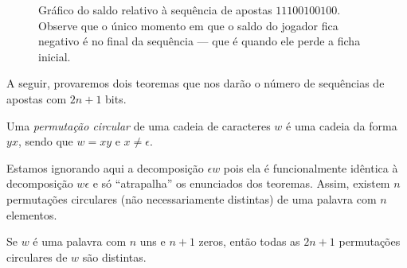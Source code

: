 \begin{figure}[h]
    \centering
    \caption{
        Gráfico do saldo relativo à sequência de apostas $11100100100$.
        Observe que o único momento em que o saldo do jogador fica negativo
        é no final da sequência
        --- que é quando ele perde a ficha inicial.
    }
    \label{fig:apostas}
\end{figure}

A seguir,
provaremos dois teoremas
que nos darão o número de sequências de apostas com $2n+1$ bits.

\begin{definition}
    Uma \emph{permutação circular}
    de uma cadeia de caracteres $w$
    é uma cadeia da forma $yx$,
    sendo que $w = xy$ e $x \neq \epsilon$.
\end{definition}

Estamos ignorando aqui a decomposição $\epsilon w$
pois ela é funcionalmente idêntica à decomposição $w \epsilon$
e só ``atrapalha'' os enunciados dos teoremas.
Assim,
existem $n$ permutações circulares (não necessariamente distintas)
de uma palavra com $n$ elementos.

\begin{lemma}
    Se $w$ é uma palavra com $n$ uns e $n+1$ zeros,
    então todas as $2n+1$ permutações circulares de $w$ são distintas.
\end{lemma}

